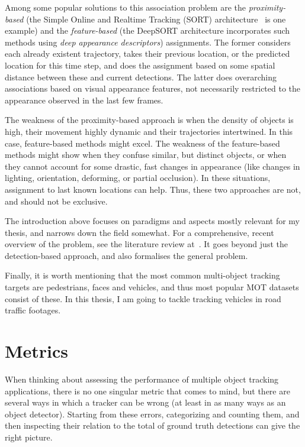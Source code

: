 Among some popular solutions to this association problem are the \textit{proximity-based} (the Simple Online and Realtime Tracking (SORT) architecture~\cite{Bewley_2016} is one example) and the \textit{feature-based} (the DeepSORT architecture \cite{DeepSORT} incorporates such methods using \textit{deep appearance descriptors}) assignments. The former considers each already existent trajectory, takes their previous location, or the predicted location for this time step, and does the assignment based on some spatial distance between these and current detections. The latter does overarching associations based on visual appearance features, not necessarily restricted to the appearance observed in the last few frames.

The weakness of the proximity-based approach is when the density of objects is high, their movement highly dynamic and their trajectories intertwined. In this case, feature-based methods might excel. The weakness of the feature-based methods might show when they confuse similar, but distinct objects, or when they cannot account for some drastic, fast changes in appearance (like changes in lighting, orientation, deforming, or partial occlusion). In these situations, assignment to last known locations can help. Thus, these two approaches are not, and should not be exclusive.

The introduction above focuses on paradigms and aspects mostly relevant for my thesis, and narrows down the field somewhat. For a comprehensive, recent overview of the problem, see the literature review at~\cite{Luo_2021}. It goes beyond just the detection-based approach, and also formalises the general problem.

Finally, it is worth mentioning that the most common multi-object tracking targets are pedestrians, faces and vehicles, and thus most popular MOT datasets consist of these. In this thesis, I am going to tackle tracking vehicles in road traffic footages.

\section{Metrics}

When thinking about assessing the performance of multiple object tracking applications, there is no one singular metric that comes to mind, but there are several ways in which a tracker can be wrong (at least in as many ways as an object detector). Starting from these errors, categorizing and counting them, and then inspecting their relation to the total of ground truth detections can give the right picture.

